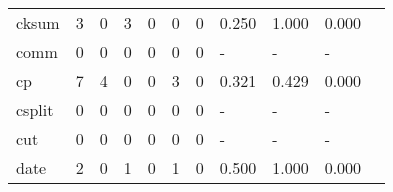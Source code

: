 \begin{longtable}{lp{1.2cm}p{1.2cm}p{1.2cm}p{1.2cm}p{1.2cm}p{1.2cm}p{1.2cm}p{1.2cm}p{1.2cm}p{1.2cm}}
cksum     &                                     3 &                                                  0 &                                                3 &                                               0 &                                                0 &                                              0 &                                              0.250 &                                              1.000 &                                              0.000 \\
comm      &                                     0 &                                                  0 &                                                0 &                                               0 &                                                0 &                                              0 &                                                  - &                                                  - &                                                  - \\
cp        &                                     7 &                                                  4 &                                                0 &                                               0 &                                                3 &                                              0 &                                              0.321 &                                              0.429 &                                              0.000 \\
csplit    &                                     0 &                                                  0 &                                                0 &                                               0 &                                                0 &                                              0 &                                                  - &                                                  - &                                                  - \\
cut       &                                     0 &                                                  0 &                                                0 &                                               0 &                                                0 &                                              0 &                                                  - &                                                  - &                                                  - \\
date      &                                     2 &                                                  0 &                                                1 &                                               0 &                                                1 &                                              0 &                                              0.500 &                                              1.000 &                                              0.000 \\

\end{longtable}
